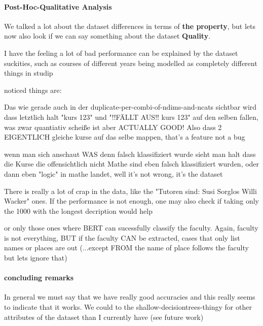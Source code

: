 \paragraph{Post-Hoc-Qualitative Analysis}
\label{sec:duplicate_maps}


We talked a lot about the dataset differences in terms of \textbf{the property}, but lets now also look if we can say something about the dataset \textbf{Quality}.

I have the feeling a lot of bad performance can be explained by the dataset suckities, such as courses of different years being modelled as completely different things in studip

noticed things are:

Das wie gerade auch in der duplicate-per-combi-of-ndims-and-ncats sichtbar wird dass letztlich halt "kurs 123" und "!!FÄLLT AUS!! kurs 123" auf den selben fallen, was zwar quantiativ scheiße ist aber ACTUALLY GOOD! Also dass 2 EIGENTLICH gleiche kurse auf das selbe mappen, that's a feature not a bug

wenn man sich anschaut WAS denn falsch klassifiziert wurde sieht man halt dass die Kurse die offensichtlich nicht Mathe sind eben falsch klassifiziert wurden, oder dann eben "logic" in mathe landet, well it's not wrong, it's the dataset 

There is really a lot of crap in the data, like the  "Tutoren sind: Susi Sorglos Willi Wacker" ones. If the performance is not enough, one may also check if taking only the 1000 with the longest decription would help

or only those ones where BERT can sucessfully classify the faculty. Again, faculty is not everything, BUT if the faculty CAN be extracted, cases that only list names or places are out (...except FROM the name of place follows the faculty but lets ignore that)



\paragraph{concluding remarks}

In general we must say that we have really good accuracies and this really seems to indicate that it works.  We could to the shallow-decisiontrees-thingy for other attributes of the dataset than I currently have (see future work)

